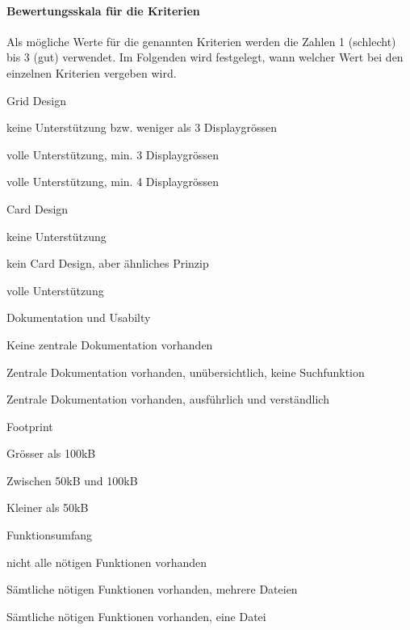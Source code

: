 \paragraph*{Bewertungsskala für die Kriterien}
Als mögliche Werte für die genannten Kriterien werden die Zahlen 1 (schlecht) bis 3 (gut) verwendet. Im Folgenden wird festgelegt, wann welcher Wert bei den einzelnen Kriterien vergeben wird.
\begin{itemize*}
\item Grid Design
  \begin{enumerate*}
  \item keine Unterstützung bzw. weniger als 3 Displaygrössen
  \item volle Unterstützung, min. 3 Displaygrössen
  \item volle Unterstützung, min. 4 Displaygrössen
  \end{enumerate*}
\item Card Design
  \begin{enumerate*}
  \item keine Unterstützung
  \item kein Card Design, aber ähnliches Prinzip
  \item volle Unterstützung
  \end{enumerate*}
\item Dokumentation und Usabilty
  \begin{enumerate*}
  \item Keine zentrale Dokumentation vorhanden
  \item Zentrale Dokumentation vorhanden, unübersichtlich, keine Suchfunktion
  \item Zentrale Dokumentation vorhanden, ausführlich und verständlich
  \end{enumerate*}
\item Footprint
  \begin{enumerate*}
  \item Grösser als 100kB
  \item Zwischen 50kB und 100kB
  \item Kleiner als 50kB
  \end{enumerate*}
\item Funktionsumfang
  \begin{enumerate*}
  \item nicht alle nötigen Funktionen vorhanden
  \item Sämtliche nötigen Funktionen vorhanden, mehrere Dateien
  \item Sämtliche nötigen Funktionen vorhanden, eine Datei
  \end{enumerate*}
\end{itemize*}



